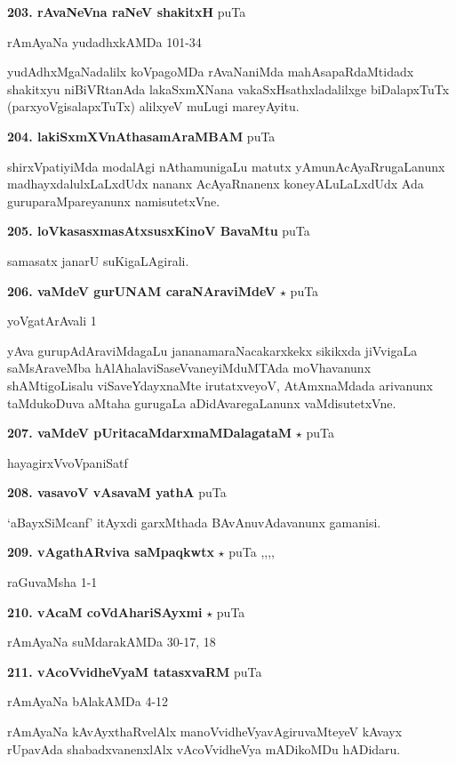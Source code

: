\medskip
\noindent\textbf{203. rAvaNeVna raNeV shakitxH} \hfill puTa \pageref{120}

\hfill rAmAyaNa yudadhxkAMDa 101-34

yudAdhxMgaNadalilx koVpagoMDa rAvaNaniMda mahAsapaRdaMtidadx shakitxyu niBiVRtanAda lakaSxmXNana vakaSxHsathxladalilxge biDalapxTuTx (parxyoVgisalapxTuTx) alilxyeV muLugi mareyAyitu.

\medskip
\noindent\textbf{204. lakiSxmXVnAthasamAraMBAM} \hfill puTa \pageref{48b}

\hfill shirxVpatiyiMda modalAgi nAthamunigaLu matutx yAmunAcAyaRrugaLanunx madhayxdalulxLaLxdUdx nananx AcAyaRnanenx koneyALuLaLxdUdx Ada guruparaMpareyanunx namisutetxVne.

\medskip
\noindent\textbf{205. loVkasasxmasAtxsusxKinoV BavaMtu} \hfill puTa \pageref{193b}

\hfill samasatx janarU suKigaLAgirali.

\medskip
\noindent\textbf{206. vaMdeV gurUNAM caraNAraviMdeV} $\star$ \hfill puTa \pageref{180a}

\hfill yoVgatArAvali 1

yAva gurupAdAraviMdagaLu jananamaraNacakarxkekx  sikikxda jiVvigaLa saMsAraveMba hAlAhalaviSaseVvaneyiMduMTAda moVhavanunx shAMtigoLisalu viSaveYdayxnaMte irutatxveyoV, AtAmxnaMdada arivanunx taMdukoDuva aMtaha gurugaLa aDidAvaregaLanunx vaMdisutetxVne.

\medskip
\noindent\textbf{207. vaMdeV pUritacaMdarxmaMDalagataM} $\star$ \hfill puTa \pageref{32a}

\hfill hayagirxVvoVpaniSatf

\medskip
\noindent\textbf{208. vasavoV vAsavaM yathA} \hfill puTa \pageref{250e}

\hfill `aBayxSiMcanf' itAyxdi garxMthada BAvAnuvAdavanunx gamanisi.

\medskip
\noindent\textbf{209. vAgathARviva saMpaqkwtx} $\star$ \hfill puTa \pageref{21b},\pageref{31b},\pageref{223a},\pageref{234},\pageref{238}

\hfill raGuvaMsha 1-1

\medskip
\noindent\textbf{210. vAcaM coVdAhariSAyxmi} $\star$ \hfill puTa \pageref{232}

\hfill rAmAyaNa suMdarakAMDa 30-17, 18

\medskip
\noindent\textbf{211. vAcoVvidheVyaM tatasxvaRM} \hfill puTa \pageref{189a}

\hfill rAmAyaNa bAlakAMDa 4-12

rAmAyaNa kAvAyxthaRvelAlx manoVvidheVyavAgiruvaMteyeV kAvayx rUpavAda shabadxvanenxlAlx vAcoVvidheVya mADikoMDu hADidaru.

